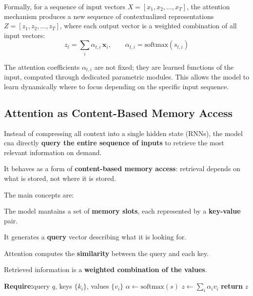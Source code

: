 Formally, for a sequence of input vectors \(X = [x_1, x_2, \dots, x_T]\), the attention mechanism produces a new sequence of contextualized representations \(Z = [z_1, z_2, \dots, z_T]\), where each output vector is a weighted combination of all input vectors:
\[
z_t = \sum_i \alpha_{t,i} \, \mathbf{x}_i, \qquad \alpha_{t,i} = \text{softmax}(s_{t,i})
\]
\begin{infobox}[Important]
The attention coefficients \(\alpha_{t,i}\) are not fixed; they are learned functions of the input, computed through dedicated parametric modules. This allows the model to learn dynamically where to focus depending on the specific input sequence.
\end{infobox}

\subsection{Attention as Content-Based Memory Access}

Instead of compressing all context into a single hidden state (RNNs), the model cna directly \textbf{query the entire sequence of inputs}  to retrieve the most relevant information on demand.

It behaves as a form of \textbf{content-based memory access}: retrieval depends on what is stored, not where it is stored.

The main concepts are:
\begin{compactitemize}
    \item The model mantains a set of \textbf{memory slots}, each represented by a \textbf{key-value} pair.
    \item It generates a \textbf{query} vector describing what it is looking for.
    \item Attention computes the \textbf{similarity} between the query and each key.
    \item Retrieved information is a \textbf{weighted combination of the values}.
\end{compactitemize}

\begin{algorithm}[H]
    \caption{Content-based Retrieval}
    \textbf{Require:}query $q$, keys $\{k_i\}$, values $\{v_i\}$
    $\alpha \leftarrow \text{softmax}(s)$ 
    $z \leftarrow \sum_i \alpha_i v_i$ 
    \textbf{return} $z$
\end{algorithm}

